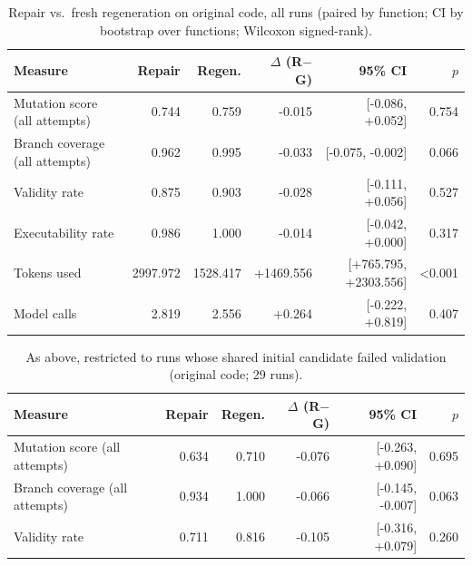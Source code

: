 \begin{table}[t]
\centering\small
\caption{Repair vs.\ fresh regeneration on original code, all runs (paired by function; CI by bootstrap over functions; Wilcoxon signed-rank).}
\label{tab:main-original}
\begin{tabular}{lrrrrr}
\toprule
Measure & Repair & Regen. & $\Delta$ (R$-$G) & 95\% CI & $p$ \\
\midrule
Mutation score (all attempts) & 0.744 & 0.759 & -0.015 & [-0.086, +0.052] & 0.754 \\
Branch coverage (all attempts) & 0.962 & 0.995 & -0.033 & [-0.075, -0.002] & 0.066 \\
Validity rate & 0.875 & 0.903 & -0.028 & [-0.111, +0.056] & 0.527 \\
Executability rate & 0.986 & 1.000 & -0.014 & [-0.042, +0.000] & 0.317 \\
Tokens used & 2997.972 & 1528.417 & +1469.556 & [+765.795, +2303.556] & <0.001 \\
Model calls & 2.819 & 2.556 & +0.264 & [-0.222, +0.819] & 0.407 \\
\bottomrule
\end{tabular}
\end{table}

\begin{table}[t]
\centering\small
\caption{As above, restricted to runs whose shared initial candidate failed validation (original code; 29 runs).}
\label{tab:fail-original}
\begin{tabular}{lrrrrr}
\toprule
Measure & Repair & Regen. & $\Delta$ (R$-$G) & 95\% CI & $p$ \\
\midrule
Mutation score (all attempts) & 0.634 & 0.710 & -0.076 & [-0.263, +0.090] & 0.695 \\
Branch coverage (all attempts) & 0.934 & 1.000 & -0.066 & [-0.145, -0.007] & 0.063 \\
Validity rate & 0.711 & 0.816 & -0.105 & [-0.316, +0.079] & 0.260 \\
\bottomrule
\end{tabular}
\end{table}

